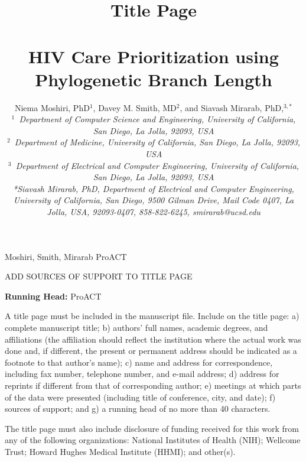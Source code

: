 \documentclass[oupdraft]{sysbio}
\newcommand{\TODO}[1]{{\color{red} #1} }
\begin{document}
\title{Title Page\\~\\HIV Care Prioritization using Phylogenetic Branch Length}

\author{Niema Moshiri, PhD$^{1}$, Davey M. Smith, MD$^{2}$, and
Siavash Mirarab, PhD,$^{3,\ast}$\\[4pt]
\textit{$^{1}$~Department of Computer Science and Engineering, University of California, San Diego, La Jolla, 92093, USA}
\\
\textit{$^{2}$~Department of Medicine, University of California, San Diego, La Jolla, 92093, USA}
\\
\textit{$^{3}$~Department of Electrical and Computer Engineering, University of California, San Diego, La Jolla, 92093, USA}
\\[2pt]
\textit{*Siavash Mirarab, PhD, Department of Electrical and Computer Engineering, University of California, San Diego, 9500 Gilman Drive, Mail Code 0407, La Jolla, USA, 92093-0407, 858-822-6245, smirarab@ucsd.edu}}

\markboth%
{Moshiri, Smith, Mirarab}
{ProACT}

\maketitle

\TODO{ADD SOURCES OF SUPPORT TO TITLE PAGE}

\textbf{Running Head:} ProACT

\TODO{A title page must be included in the manuscript file. Include on the title page: a) complete manuscript title; b) authors' full names, academic degrees, and affiliations (the affiliation should reflect the institution where the actual work was done and, if different, the present or permanent address should be indicated as a footnote to that author's name); c) name and address for correspondence, including fax number, telephone number, and e-mail address; d) address for reprints if different from that of corresponding author; e) meetings at which parts of the data were presented (including title of conference, city, and date); f) sources of support; and g) a running head of no more than 40 characters.

The title page must also include disclosure of funding received for this work from any of the following organizations: National Institutes of Health (NIH); Wellcome Trust; Howard Hughes Medical Institute (HHMI); and other(s).}
\end{document}
